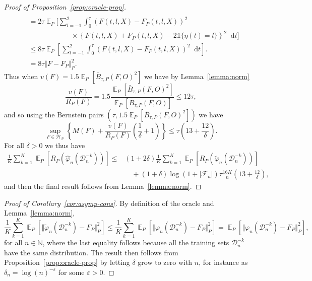 \documentclass[a4paper,danish]{article}
\theoremstyle{plain} %
\numberwithin{theorem}{section}
\theoremstyle{definition} %
\theoremstyle{remark}
\DeclareMathOperator{\E}{\mathbb{E}} %
\newcommand{\N}{\mathbb{N}}
\renewcommand{\phi}{\varphi}
\renewcommand{\epsilon}{\varepsilon}
\newcommand*\diff{\mathop{}\!\mathrm{d}}
\newcommand{\1}{\mathds{1}}
\newcommand{\data}{\ensuremath{\mathcal{D}}}
\begin{document}
\begin{proof}[Proof of Proposition~\ref{prop:oracle-prop}]
\begin{align*}
  \\
  & =2\tau
    \E_{P}\Bigg[
    \sum_{l=-1}^{2} \int_0^{\tau}
    \left(
    F(t, l, X) - F_P(t, l, X)
    \right)^2
  \\
  & \quad \quad \quad\quad \quad \quad \times
    \left\{
    F(t, l, X) +  F_P(t, l, X)-2 \1{\{\eta(t) = l\}}
    \right\}^2
    \diff t 
    \Bigg]
  \\
  & \leq
    8\tau \E_{P}{\left[
    \sum_{l=-1}^{2} \int_0^{\tau}
    \left(
    F(t, l, X) - F_P(t, l, X)
    \right)^2
    \diff t 
    \right]}.
  \\
  & =
    8\tau \Vert F - F_P \Vert_{P}^2.
\end{align*}
Thus when \( v(F) = 1.5 \E_P{[\bar{B}_{\tau,P}(F, O)^2]} \) we have by
Lemma~\ref{lemma:norm}
\begin{equation*}
  \frac{v(F)}{R_P(F)}
  = 1.5 \frac{\E_P{[\bar{B}_{\tau,P}(F, O)^2]}}{\E_P{[\bar{B}_{\tau,P}(F, O)]}}
  \leq 12 \tau,
\end{equation*}
and so using the Bernstein pairs \( (\tau, 1.5 \E_P{[\bar{B}_{\tau,P}(F, O)^2]}) \) we have
\begin{equation*}
  \sup_{F \in \mathcal{H}_{\mathcal{P}}}
  \left\{
    M(F) + \frac{v(F)}{R_P(F)}
    \left(
      \frac{1}{\delta} + 1
    \right)
  \right\}
  \leq \tau
  \left(
    13 + \frac{12}{\delta}
  \right).
\end{equation*}
For all $\delta>0$ we thus have
\begin{align*}
  \frac{1}{K} \sum_{k=1}^{K} \E_{P}{\left[ R_P(\hat{\phi}_n(\data_n^{-k})) \right]}
  \leq
  &(1+2\delta)\frac{1}{K} \sum_{k=1}^{K}\E_{P}{\left[ R_P(\tilde{\phi}_n(\data_n^{-k})) \right]}
  \\
  & \quad
    + (1+\delta)\log(1 + |\mathcal{F}_n|) \tau \frac{16 K}{n}
    \left(
    13 + \frac{12}{\delta}
    \right),
\end{align*}
and then the final result follows from Lemma~\ref{lemma:norm}.
\end{proof}

\begin{proof}[Proof of Corollary~\ref{cor:asymp-cons}]
  By definition of the oracle and Lemma~\ref{lemma:norm},
  \begin{equation*}
    \frac{1}{K} \sum_{k=1}^{K} \E_{P}{\left[ \Vert \tilde{\phi}_n(\data_n^{-k}) - F_P \Vert_{P}^2
      \right]} \leq
    \frac{1}{K} \sum_{k=1}^{K}\E_{P}{\left[ \Vert
        \phi_n(\data_n^{-k}) - F_P \Vert_{P}^2
      \right]}
    =
    \E_{P}{\left[ \Vert \phi_n(\data_n^{-k}) - F_P \Vert_{P}^2
      \right]},
  \end{equation*}
  for all \( n \in \N \), where the last equality follows because all
  the training sets \( \data_n^{-k} \) have the same distribution. The
  result then follows from Proposition~\ref{prop:oracle-prop} by
  letting $\delta$ grow to zero with \( n \), for instance as
  $\delta_n = \log(n)^{-\epsilon}$ for some $\epsilon>0$.
\end{proof}
\end{document}
